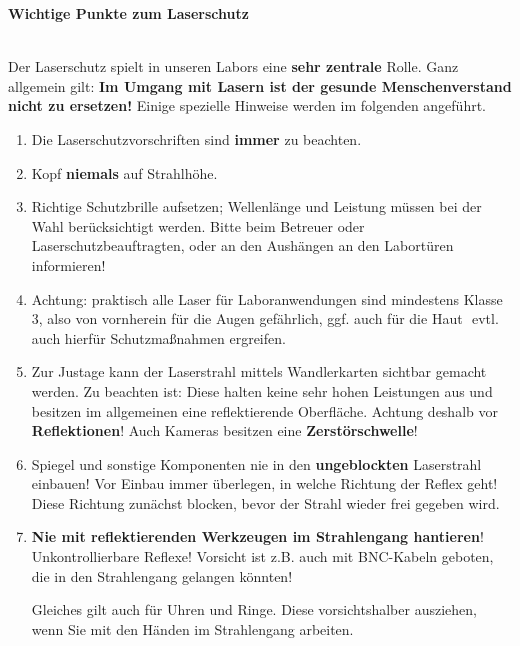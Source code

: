 \documentclass[
class=book,
accentcolor=1b,
custommargins=geometry,
fontsize=11pt,
thesis={type=Versuchsanleitung},
ruledheaders=all,
headline=false,
instbox=false,
marginpar=false,
title=small,
ignore-missing-data=true,
twoside=false,
pdfa=false %
]{apqpub}
\begin{document}
\newpage

\begin{center}
	\large\textbf{Wichtige Punkte zum Laserschutz}
\end{center}

~~\\

Der Laserschutz spielt in unseren Labors eine \textbf{sehr zentrale} Rolle. Ganz allgemein gilt: \textbf{Im Umgang mit Lasern ist der gesunde Menschenverstand nicht zu ersetzen!} Einige
spezielle Hinweise werden im folgenden angeführt.

\begin{enumerate}
	
\item Die Laserschutzvorschriften sind \textbf{immer} zu beachten.

\item Kopf \textbf{niemals} auf Strahlhöhe.

\item Richtige Schutzbrille aufsetzen; Wellenlänge und Leistung müssen bei der Wahl berücksichtigt werden. Bitte beim Betreuer oder Laserschutzbeauftragten, oder an den Aushängen an den Labortüren informieren!

\item Achtung: praktisch alle Laser für Laboranwendungen sind mindestens Klasse 3, also von vornherein für die Augen gefährlich, ggf. auch für die Haut  evtl. auch hierfür Schutzmaßnahmen ergreifen.

\item Zur Justage kann der Laserstrahl mittels Wandlerkarten sichtbar gemacht werden. Zu beachten ist: Diese halten keine sehr hohen Leistungen aus und besitzen im allgemeinen eine reflektierende Oberfläche. Achtung deshalb vor \textbf{Reflektionen}! Auch Kameras
besitzen eine \textbf{Zerstörschwelle}!

\item Spiegel und sonstige Komponenten nie in den \textbf{ungeblockten} Laserstrahl einbauen! Vor Einbau immer überlegen, in welche Richtung der Reflex geht! Diese Richtung zunächst blocken, bevor der Strahl wieder frei gegeben wird.

\item \textbf{Nie mit reflektierenden Werkzeugen im Strahlengang hantieren}! Unkontrollierbare Reflexe! Vorsicht ist z.B. auch mit BNC-Kabeln geboten, die in den Strahlengang gelangen könnten!

Gleiches gilt auch für Uhren und Ringe. Diese vorsichtshalber ausziehen, wenn Sie mit den Händen im Strahlengang arbeiten.


\end{enumerate}
\end{document}
